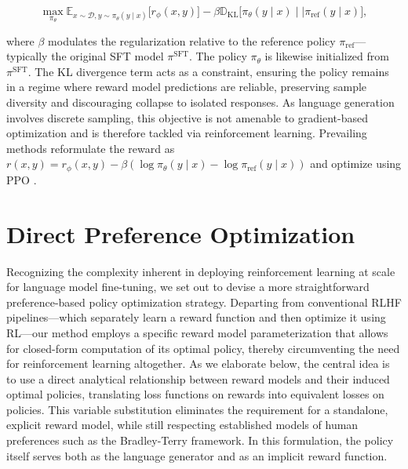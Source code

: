 \begin{equation}\label{eq:RL}
\max_{\pi_{\theta}}  \mathbb{E}_{x\sim \mathcal{D}, y\sim \pi_{\theta}(y \mid x)}\bigl[r_{\phi}(x, y)\bigr] - \beta\mathbb{D}_{\textrm{KL}}\bigl[\pi_{\theta}(y\mid x)\mid \mid \pi_\text{ref}(y\mid x)\bigr],
\end{equation}

where $\beta$ modulates the regularization relative to the reference policy $\pi_\text{ref}$—typically the original SFT model $\pi^\text{SFT}$. The policy $\pi_\theta$ is likewise initialized from $\pi^\text{SFT}$. The KL divergence term acts as a constraint, ensuring the policy remains in a regime where reward model predictions are reliable, preserving sample diversity and discouraging collapse to isolated responses. As language generation involves discrete sampling, this objective is not amenable to gradient-based optimization and is therefore tackled via reinforcement learning. Prevailing methods \citep{ziegler2020finetuning, stiennon2022learning, bai2022training, ouyang2022training} reformulate the reward as ${r(x, y) = r_{\phi}(x, y) -\beta (\log \pi_{\theta}(y\mid x) - \log \pi_\text{ref}(y\mid x))}$ and optimize using PPO \cite{schulman2017proximal}. 

\section{Direct Preference Optimization}\label{sec:DPO}

Recognizing the complexity inherent in deploying reinforcement learning at scale for language model fine-tuning, we set out to devise a more straightforward preference-based policy optimization strategy. Departing from conventional RLHF pipelines—which separately learn a reward function and then optimize it using RL—our method employs a specific reward model parameterization that allows for closed-form computation of its optimal policy, thereby circumventing the need for reinforcement learning altogether. As we elaborate below, the central idea is to use a direct analytical relationship between reward models and their induced optimal policies, translating loss functions on rewards into equivalent losses on policies. This variable substitution eliminates the requirement for a standalone, explicit reward model, while still respecting established models of human preferences such as the Bradley-Terry framework. In this formulation, the policy itself serves both as the language generator and as an implicit reward function.

